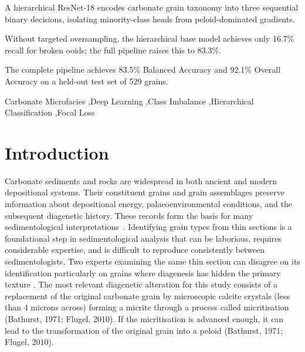 \documentclass[a4paper,fleqn]{cas-dc}
\begin{document}
\begin{highlights}
\item A hierarchical ResNet-18 encodes carbonate grain taxonomy into three sequential binary decisions, isolating minority-class heads from peloid-dominated gradients.
\item Without targeted oversampling, the hierarchical base model achieves only 16.7\% recall for broken ooids; the full pipeline raises this to 83.3\%.
\item The complete pipeline achieves 83.5\% Balanced Accuracy and 92.1\% Overall Accuracy on a held-out test set of 529 grains.
\end{highlights}

\begin{keywords}
Carbonate Microfacies \sep Deep Learning \sep Class Imbalance \sep Hierarchical Classification \sep Focal Loss
\end{keywords}

\maketitle


\section{Introduction}
Carbonate sediments and rocks are widespread in both ancient and modern depositional systems. Their constituent grains and grain assemblages preserve information about depositional energy, palaeoenvironmental conditions, and the subsequent diagenetic history. These records form the basis for many sedimentological interpretations~\citep{flugel2010}. Identifying grain types from thin sections is a foundational step in sedimentological analysis that can be laborious, requires considerable expertise, and is difficult to reproduce consistently between sedimentologists. Two experts examining the same thin section can disagree on its identification particularly on grains where diagenesis has hidden the primary texture \citep{flugel2010}. The most relevant diagenetic alteration for this study consists of a replacement of the original carbonate grain by microscopic calcite crystals (less than 4 microns across) forming  a micrite through a process called micritisation (Bathurst, 1971; Flugel, 2010). If the micritisation is advanced enough, it can lead to the transformation of the original grain into a peloid (Bathurst, 1971; Flugel, 2010).
\end{document}
